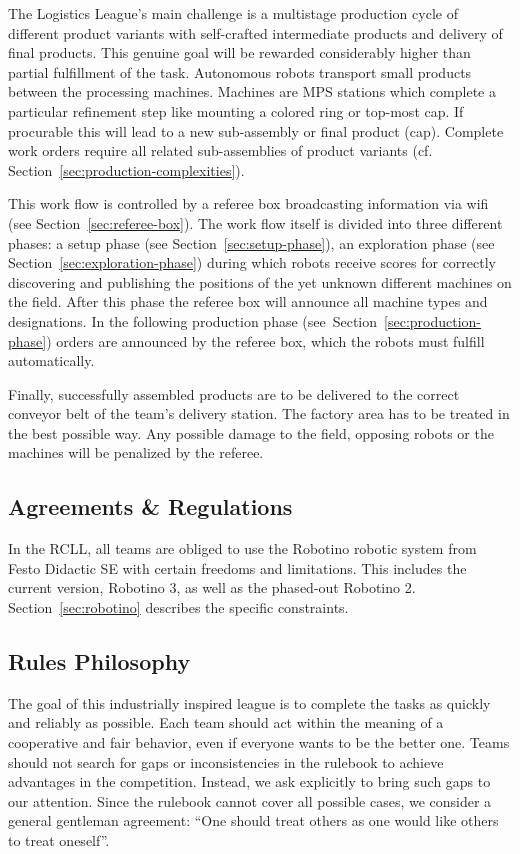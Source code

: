 \documentclass[12pt,twoside]{article}
\newcommand{\refsec}[1]{Section~\ref{#1}}
\begin{document}
The Logistics League's main challenge is a multistage production cycle
of different product variants with self-crafted intermediate products
and delivery of final products. This genuine goal will be rewarded
considerably higher than partial fulfillment of the task. Autonomous
robots transport small products between the processing
machines. Machines are MPS stations which complete a particular
refinement step like mounting a colored ring or top-most cap. If
procurable this will lead to a new sub-assembly or final product
(cap). Complete work orders require all related sub-assemblies of
product variants (cf. \refsec{sec:production-complexities}).

This work flow is controlled by a referee box broadcasting information
via wifi (see \refsec{sec:referee-box}). The work flow itself is
divided into three different phases: a setup
phase (see \refsec{sec:setup-phase}), an exploration phase (see
\refsec{sec:exploration-phase}) during which robots receive scores for
correctly discovering and publishing the positions of the yet
unknown different machines on the field. After this phase the referee
box will announce all machine types and designations. In the following
production phase (see~\refsec{sec:production-phase}) orders are
announced by the referee box, which the robots must fulfill
automatically.

Finally,
successfully assembled products are to be delivered to the correct
conveyor belt of the team's delivery station. The factory
area has to be treated in the best possible way. Any possible damage
to the field, opposing robots or the machines will be penalized by the
referee.

\subsection{Agreements \& Regulations}
\label{sec:agreements}
In the RCLL, all teams are obliged to use the Robotino robotic system
from Festo Didactic SE with certain freedoms and limitations. This
includes the current version, Robotino 3, as well as the phased-out
Robotino 2. \refsec{sec:robotino} describes the specific constraints.



\subsection{Rules Philosophy}
\label{sec:rules-philosphy}
The goal of this industrially inspired league is to complete the tasks
as quickly and reliably as possible. Each team should act within the
meaning of a cooperative and fair behavior, even if everyone wants to
be the better one. Teams should not search for gaps or inconsistencies
in the rulebook to achieve advantages in the competition. Instead, we
ask explicitly to bring such gaps to our attention. Since the rulebook
cannot cover all possible cases, we consider a general gentleman
agreement: ``One should treat others as one would like others to treat
oneself''.
\end{document}
